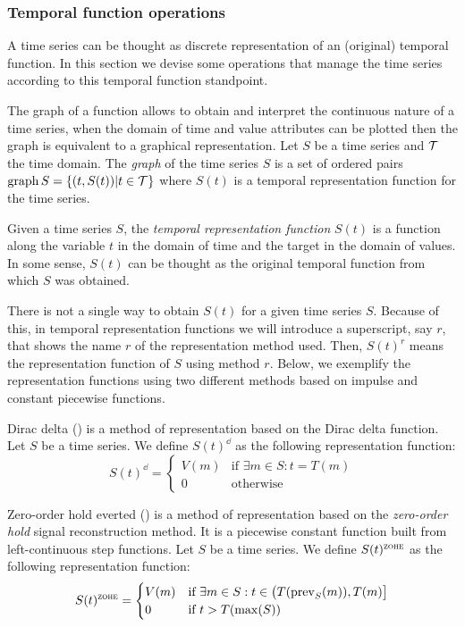\subsubsection{Temporal function operations}
\label{sec:model:tfunc}

A time series can be thought as discrete representation of an
(original) temporal function. In this section we devise some
operations that manage the time series according to this temporal
function standpoint.  
%

The graph of a function allows to obtain and interpret the
continuous nature of a time series, when the domain of time and value
attributes can be plotted then the graph is equivalent to a graphical
representation.  
%
Let $S$ be a time series and $\cal{T}$ the time domain. The \emph{graph} of
the time series $S$ is a set of ordered pairs $\operatorname*{graph} S
=\{(t,S(t))|t\in \cal{T}\}$ where $S(t)$ is a temporal representation
function for the time series.
%


Given a time series $S$, the \emph{temporal representation function}
$S(t)$ is a function along the variable $t$ in the domain of
time and the target in the domain of values.
%
In some sense, $S(t)$ can be thought as the original temporal function
from which $S$ was obtained.
%

There is not a single way to obtain $S(t)$ for a given time series
$S$. Because of this, in temporal representation functions we will
introduce a superscript, say $r$, that shows the name $r$ of the
representation method used. Then, $S(t)^r$ means the representation
function of $S$ using method $r$. Below, we exemplify the
representation functions using two different methods based on impulse
and constant piecewise functions.


\begin{definition} 
  Dirac delta (\dd) is a method of representation based on the Dirac
  delta function. Let $S$ be a time series. We define $S(t)^\dd$ as
  the following \dd{} representation function:
  \[
  S(t)^\dd
  =  \begin{cases}
          V(m) & \text{if } \exists m\in S:t=T(m) \\
          0    & \text{otherwise}
  \end{cases}
  \]
\end{definition}

\begin{definition}
  Zero-order hold everted (\zohe{}) is a method of representation
  based on the \emph{zero-order hold} signal reconstruction method. It
  is a piecewise constant function built from left-continuous step
  functions.  Let $S$ be a time series. We define $S(t)^\zohe$ as the
  following representation function:
  \[
  S(t)^\zohe 
  = \begin{cases}
    V(m) & \text{if } \exists m\in S: t\in \big(T(\prev_S(m)),T(m)\big]\\
    0    & \text{if } t > T(\max(S)) 
  \end{cases}
  \]
\end{definition}




